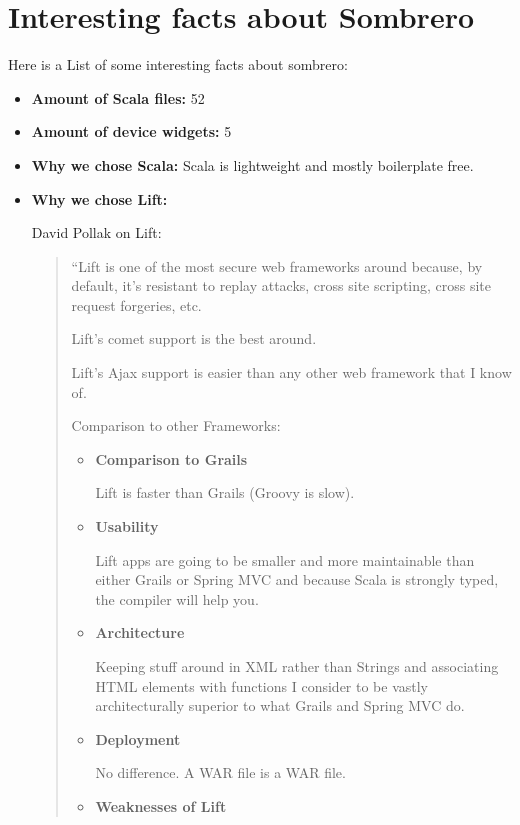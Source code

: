 \section{Interesting facts about Sombrero}
    Here is a List of some interesting facts about sombrero:
    \begin{itemize}
        \item \textbf{Amount of Scala files:} 52
        \item \textbf{Amount of device widgets:} 5
        \item \textbf{Why we chose Scala:}
            Scala is lightweight and mostly boilerplate free.
        \item \textbf{Why we chose Lift:}

            David Pollak on Lift:

        \begin{quote}
            ``Lift is one of the most secure web frameworks around because, by default, it's resistant to replay attacks, cross site scripting, cross site request forgeries, etc.

            Lift's comet support is the best around.

            Lift's Ajax support is easier than any other web framework that I know of.

            Comparison to other Frameworks:
            \begin{itemize}
                \item \textbf{Comparison to Grails}

                    Lift is faster than Grails (Groovy is slow).
                \item \textbf{Usability}

                    Lift apps are going to be smaller and more maintainable than either Grails or Spring MVC and because Scala is strongly typed, the compiler will help you.
                \item \textbf{Architecture}

                    Keeping stuff around in XML rather than Strings and associating HTML elements with functions I consider to be vastly architecturally superior to what Grails and Spring MVC do.
                \item \textbf{Deployment}

                    No difference.  A WAR file is a WAR file.
                \item \textbf{Weaknesses of Lift}


\end{itemize}
\end{quote}
\end{itemize}
